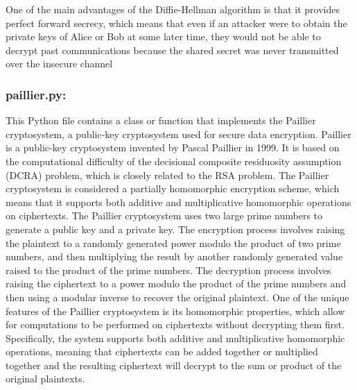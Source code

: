 \documentclass{article}
\begin{document}
One of the main advantages of the Diffie-Hellman algorithm is that it provides perfect forward secrecy, which means that even if an attacker were to obtain the private keys of Alice or Bob at some later time, they would not be able to decrypt past communications because the shared secret was never transmitted over the insecure channel

\subsubsection{paillier.py:} This Python file contains a class or function that implements the Paillier cryptosystem, a public-key cryptosystem used for secure data encryption.
Paillier is a public-key cryptosystem invented by Pascal Paillier in 1999.
It is based on the computational difficulty of the decisional composite residuosity assumption (DCRA) problem, which is closely related to the RSA problem.
The Paillier cryptosystem is considered a partially homomorphic encryption scheme, which means that it supports both additive and multiplicative homomorphic operations on ciphertexts.
The Paillier cryptosystem uses two large prime numbers to generate a public key and a private key.
The encryption process involves raising the plaintext to a randomly generated power modulo the product of two prime numbers, and then multiplying the result by another randomly generated value raised to the product of the prime numbers. The decryption process involves raising the ciphertext to a power modulo the product of the prime numbers and then using a modular inverse to recover the original plaintext.
One of the unique features of the Paillier cryptosystem is its homomorphic properties, which allow for computations to be performed on ciphertexts without decrypting them first.
Specifically, the system supports both additive and multiplicative homomorphic operations, meaning that ciphertexts can be added together or multiplied together and the resulting ciphertext will decrypt to the sum or product of the original plaintexts.
\end{document}
